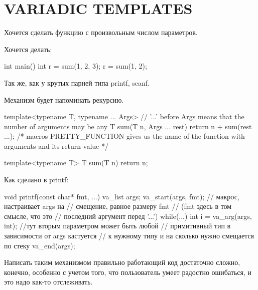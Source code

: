 \section{VARIADIC TEMPLATES}

Хочется сделать функцию с произвольным числом параметров.

Хочется делать:
\begin{cppcode}
int main() {
        int r = sum(1, 2, 3);
        r = sum(1, 2);
}
\end{cppcode}

Так же, как у крутых парней типа printf, scanf.

Механизм будет напоминать рекурсию.

\begin{cppcode}
template<typename T, typename ... Args> 
// '...' before Args means that the number of arguments may be any
T sum(T n, Args ... rest) {
	return n + sum(rest ...);
}
/* macros PRETTY_FUNCTION gives us the name 
of the function with arguments and its return value */

template<typename T>
T sum(T n) {
	return n;
}
\end{cppcode}


Как сделано в printf:

\begin{cppcode}
void printf(const char* fmt, ...) {
	va_list args;
	va_start(args, fmt); // макрос, настраивает args на 
                     	// смещение, равное размеру fmt
                     	// (fmt здесь в том смысле, что это
						// последний аргумент перед '...')
	while(...) {
		int i = va_arg(args, int); //тут вторым параметром может быть любой 
		                          // примитивный тип в зависимости от args кастуется 
		                          // к нужному типу и на сколько нужно смещается по стеку
	}
	va_end(args);
}
\end{cppcode}

Написать таким механизмом правильно работающий код достаточно сложно, конечно, особенно с учетом того, 
что пользователь умеет радостно ошибаться, и это надо как-то отслеживать.